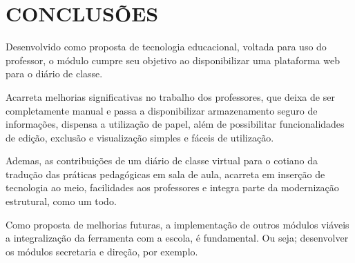 \chapter{CONCLUSÕES}
\label{cap:conclusao}

Desenvolvido como proposta de tecnologia educacional, voltada para uso do professor, o módulo cumpre seu objetivo ao disponibilizar uma plataforma web para o diário de classe. 

Acarreta melhorias significativas no trabalho dos professores, que deixa de ser completamente manual e passa a disponibilizar armazenamento seguro de informações, dispensa a utilização de papel, além de possibilitar funcionalidades de edição, exclusão e visualização simples e fáceis de utilização.


Ademas, as contribuições de um diário de classe virtual para o cotiano da tradução das práticas pedagógicas em sala de aula, acarreta em inserção de tecnologia ao meio, facilidades aos professores e integra parte da modernização estrutural, como um todo.

Como proposta de melhorias futuras, a implementação de outros módulos viáveis a integralização da ferramenta com a escola, é fundamental. Ou seja; desenvolver os módulos secretaria e direção, por exemplo.
